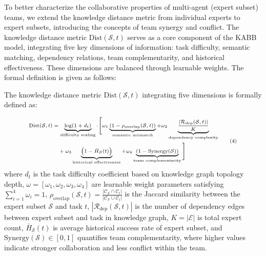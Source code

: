 To better characterize the collaborative properties of multi-agent\cite{duoagent} (expert \cite{moe}subset) teams, we extend the knowledge distance metric from individual experts to expert subsets, introducing the concepts of team synergy and conflict\cite{biaozhen}. The knowledge distance \cite{qi2025graphfeedbackbanditssimilar}metric $\text{Dist}(\mathcal{S}, t)$ serves as a core component of the KABB model, integrating five key dimensions of information: task difficulty, semantic matching, dependency relations, team complementarity, and historical effectiveness. These dimensions are balanced through learnable weights. The formal definition is given as follows:\begin{definition}
The knowledge distance metric $\text{Dist}(\mathcal{S}, t)$ integrating five dimensions is formally defined as:

\begin{equation}
\scriptsize
\begin{aligned}
\text{Dist}(\mathcal{S}, t) &= \underbrace{\log(1 + d_t)}_{\text{difficulty scaling}} \cdot \Bigg[ 
\omega_1\underbrace{\left(1 - \rho_{\text{overlap}}(\mathcal{S}, t)\right)}_{\text{semantic mismatch}} 
+ \omega_2\underbrace{\frac{|\mathcal{R}_{\text{dep}}(\mathcal{S}, t)|}{K}}_{\text{dependency complexity}} \\
&\quad + \omega_3\underbrace{\left(1 - \bar{H}_{\mathcal{S}}(t)\right)}_{\text{historical effectiveness}} 
+ \omega_4\underbrace{\left(1 - \mathrm{Synergy}(\mathcal{S})\right)}_{\text{team complementarity}} \Bigg] 
\end{aligned}
\tag{4}
\label{eq:emc4}
\end{equation}
where $d_t$ is the task difficulty coefficient based on knowledge graph topology depth, $\omega = [\omega_1, \omega_2, \omega_3, \omega_4]$ are learnable weight parameters satisfying $\sum_{i=1}^4 \omega_i = 1$, $\rho_{\text{overlap}}(\mathcal{S}, t) = \frac{|\mathcal{C}_{\mathcal{S}} \cap \mathcal{C}_t|}{|\mathcal{C}_{\mathcal{S}} \cup \mathcal{C}_t|}$ is the Jaccard similarity between the expert subset $\mathcal{S}$ and task $t$, $|\mathcal{R}_{\text{dep}}(\mathcal{S}, t)|$ is the number of dependency edges between expert subset and task in knowledge graph, $K = |\mathcal{E}|$ is total expert count, $\bar{H}_{\mathcal{S}}(t)$ is average historical success rate of expert subset, and $\mathrm{Synergy}(\mathcal{S}) \in [0,1]$ quantifies team complementarity, where higher values indicate stronger collaboration and less conflict within the team.
\end{definition}

